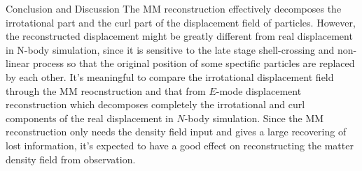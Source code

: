 \begin{section}{Conclusion and Discussion}
   The MM reconstruction effectively decomposes the irrotational part and the curl part of the displacement 
field of particles. However, the reconstructed displacement might be greatly different from real displacement in N-body 
simulation, since it is sensitive to the late stage shell-crossing and non-linear process so that the original 
position of some spectific particles are replaced by each other. It's meaningful to compare the irrotational 
displacement field through the MM reocnstruction and that from $E$-mode displacement reconstruction \cite{bib:Yu2016} 
which decomposes completely the irrotational and curl components of the real displacement in $N$-body simulation. 
Since the MM reconstruction only needs the density field input and gives a large recovering of lost information, 
it's expected to have a good effect on reconstructing the matter density field from observation.
\end{section}
